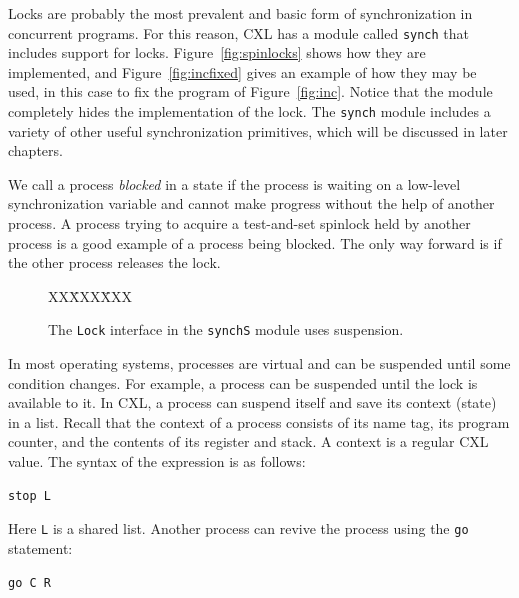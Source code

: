 \documentclass{report}
\newcommand{\cxlsource}[1]{
\begin{tabbing}
XX\=XXX\=XXX\kill
    
\end{tabbing}
}
\newenvironment{code}{
\tcolorbox
}{
\endtcolorbox
}
\begin{document}
Locks are probably the most prevalent and basic form of synchronization
in concurrent programs.  For this reason, CXL has a module called
\texttt{synch} that includes support for locks.
Figure~\ref{fig:spinlocks} shows how they are implemented, and
Figure~\ref{fig:incfixed} gives an example of how they may be used,
in this case to fix the program of Figure~\ref{fig:inc}.
Notice that the module completely hides the implementation of the
lock.
The \texttt{synch} module includes a variety of other useful
synchronization primitives, which will be discussed in later
chapters.


We call a process \emph{blocked}
in a state if the process is waiting on a low-level synchronization
variable and cannot make progress without the help of another process.
A process trying to
acquire a test-and-set spinlock held by another process is a good example
of a process being blocked.
The only way forward is if the other process releases the lock.

\begin{figure}
\begin{code}
\cxlsource{locksusp}
\end{code}
\caption{The \texttt{Lock} interface in the \texttt{synchS} module uses suspension.}
\label{fig:suspension}
\end{figure}

In most operating systems, processes are virtual and can be suspended
until some condition changes.  For example, a process can be suspended
until the lock is available to it.
In CXL, a process can suspend itself and save its context (state) in a
list.  Recall that the context of a process consists of its name tag,
its program counter, and the contents of its register and stack.
A context is a regular CXL value.
The syntax of the expression is as follows:

\begin{code}
\begin{verbatim}
stop L
\end{verbatim}
\end{code}

Here \texttt{L} is a shared list.
Another process can revive the process using the \texttt{go}
statement:

\begin{code}
\begin{verbatim}
go C R
\end{verbatim}
\end{code}
\end{document}
